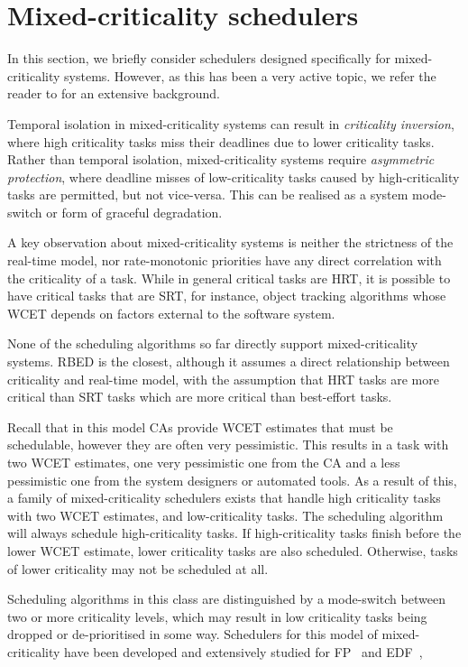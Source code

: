\section{Mixed-criticality schedulers}

In this section, we briefly consider schedulers designed specifically for mixed-criticality systems. 
However, as this has been a very active topic, we refer the reader to \citet{Burns_Davis_17} for
an extensive background. 

Temporal isolation in mixed-criticality systems can result in \emph{criticality inversion}, where
high criticality tasks miss their deadlines due to lower criticality tasks.  Rather than temporal
isolation, mixed-criticality systems require \emph{asymmetric protection}, where deadline misses of
low-criticality tasks caused by high-criticality tasks are permitted, but not vice-versa.  This can
be realised as a system mode-switch or form of graceful degradation.

A key observation about mixed-criticality systems is neither the strictness of the real-time model,
nor rate-monotonic priorities have any direct correlation with the criticality of a task.  While in
general critical tasks are \gls{HRT}, it is possible to have critical tasks that are \gls{SRT}, for
instance, object tracking algorithms whose \gls{WCET} depends on factors external to the software
system.

None of the scheduling algorithms so far directly support mixed-criticality systems.  \gls{RBED} is
the closest, although it assumes a direct relationship between criticality and real-time model, with
the assumption that \gls{HRT} tasks are more critical than \gls{SRT} tasks which are more critical
than best-effort tasks. 

Recall that in this model \glspl{CA} provide \gls{WCET} estimates that must be schedulable, however they are often very
pessimistic.  This results in a task with two {\gls{WCET}} estimates, one very pessimistic one from
the \gls{CA} and a less pessimistic one from the system designers or automated tools.  As a result
of this, a family of mixed-criticality schedulers exists that handle high criticality tasks with two
{\gls{WCET}} estimates, and low-criticality tasks.  The scheduling algorithm will always schedule
high-criticality tasks.  If high-criticality tasks finish before the lower \gls{WCET} estimate,
lower criticality tasks are also scheduled.  Otherwise, tasks of lower criticality may not be
scheduled at all. 

Scheduling algorithms in this class are distinguished by a mode-switch between two or more criticality levels,
which may result in low criticality tasks being dropped or de-prioritised in some way. 
Schedulers for this model of mixed-criticality have been developed and extensively studied for
\gls{FP}~\citep{Vestal_07, Pathan:phd} and \gls{EDF}~\citep{Baruah_BDMVS_11},


